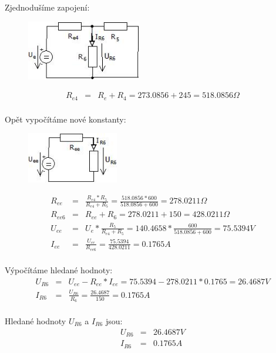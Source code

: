 Zjednodušíme zapojení:
    \begin{figure}[ht]
		\begin{center}
			\includegraphics[width=5cm,keepaspectratio]{fig/Pr2_4_2019.jpeg}
		\end{center}
	\end{figure}
    \begin{eqnarray*}
        R_{e4} &= & R_{e} + R_{4} = 273.0856 + 245 = 518.0856 \Omega\\
	\end{eqnarray*}

Opět vypočítáme nové konstanty:
    \begin{figure}[ht]
		\begin{center}
			\includegraphics[width=4cm,keepaspectratio]{fig/Pr2_5_2019.jpeg}
		\end{center}
	\end{figure}
    \begin{eqnarray*}
        R_{ee} &= & \frac{R_{e4} * R_{5}}{R_{e4} + R_{5}} = \frac{518.0856 * 600}{518.0856 + 600} = 278.0211 \Omega\\
        R_{ee6} &= & R_{ee} + R_{6} = 278.0211 + 150 = 428.0211 \Omega\\
        U_{ee} &= & U_{e}*\frac{R_{5}}{R_{e4} + R_{5}} = 140.4658 * \frac{600}{518.0856 + 600} = 75.5394 V\\
        I_{ee} &= & \frac{U_{ee}}{R_{ee6}} = \frac{75.5394}{428.0211} = 0.1765 A\\
	\end{eqnarray*}
	
Výpočítáme hledané hodnoty:
    \begin{eqnarray*}
        U_{R6} &= & U_{ee} - R_{ee} * I_{ee} = 75.5394 - 278.0211 * 0.1765 = 26.4687 V\\
        I_{R6} &= & \frac{U_{R6}}{R_{6}} = \frac{26.4687}{150} = 0.1765 A\\
	\end{eqnarray*}

Hledané hodnoty $U_{R6}$ a $I_{R6}$ jsou:
    \begin{eqnarray*}
        U_{R6} &= & 26.4687 V\\
        I_{R6} &= & 0.1765 A\\
	\end{eqnarray*}